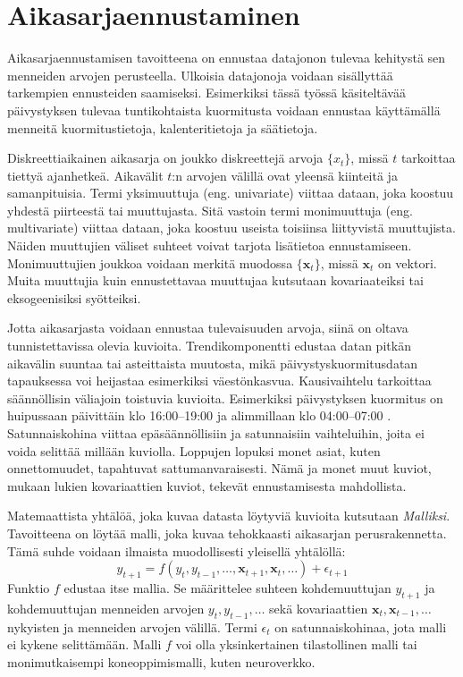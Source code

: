 \section*{Aikasarjaennustaminen}

Aikasarjaennustamisen tavoitteena on ennustaa datajonon tulevaa kehitystä sen menneiden arvojen perusteella. Ulkoisia datajonoja voidaan sisällyttää tarkempien ennusteiden saamiseksi. \cite{hyndman2018forecasting} Esimerkiksi tässä työssä käsiteltävää päivystyksen tulevaa tuntikohtaista kuormitusta voidaan ennustaa käyttämällä menneitä kuormitustietoja, kalenteritietoja ja säätietoja.

Diskreettiaikainen aikasarja on joukko diskreettejä arvoja $\{x_t\}$, missä $t$ tarkoittaa tiettyä ajanhetkeä. Aikavälit $t$:n arvojen välillä ovat yleensä kiinteitä ja samanpituisia. Termi yksimuuttuja (eng. univariate) viittaa dataan, joka koostuu yhdestä piirteestä tai muuttujasta. Sitä vastoin termi monimuuttuja (eng. multivariate) viittaa dataan, joka koostuu useista toisiinsa liittyvistä muuttujista. Näiden muuttujien väliset suhteet voivat tarjota lisätietoa ennustamiseen. Monimuuttujien joukkoa voidaan merkitä muodossa $\{\mathbf{x}_{t}\}$, missä $\mathbf{x}_t$ on vektori. Muita muuttujia kuin ennustettavaa muuttujaa kutsutaan kovariaateiksi tai eksogeenisiksi syötteiksi. \cite{brockwell_introduction_2016}

Jotta aikasarjasta voidaan ennustaa tulevaisuuden arvoja, siinä on oltava tunnistettavissa olevia kuvioita. Trendikomponentti edustaa datan pitkän aikavälin suuntaa tai asteittaista muutosta, mikä päivystyskuormitusdatan tapauksessa voi heijastaa esimerkiksi väestönkasvua. Kausivaihtelu tarkoittaa säännöllisin väliajoin toistuvia kuvioita. Esimerkiksi päivystyksen kuormitus on huipussaan päivittäin klo 16:00–19:00 ja alimmillaan klo 04:00–07:00 \cite{tuominen_forecasting_2024}. Satunnaiskohina viittaa epäsäännöllisiin ja satunnaisiin vaihteluihin, joita ei voida selittää millään kuviolla. Loppujen lopuksi monet asiat, kuten onnettomuudet, tapahtuvat sattumanvaraisesti. Nämä ja monet muut kuviot, mukaan lukien kovariaattien kuviot, tekevät ennustamisesta mahdollista. \cite{brockwell_introduction_2016}

Matemaattista yhtälöä, joka kuvaa datasta löytyviä kuvioita kutsutaan \emph{Malliksi}. Tavoitteena on löytää malli, joka kuvaa tehokkaasti aikasarjan perusrakennetta. Tämä suhde voidaan ilmaista muodollisesti yleisellä yhtälöllä:
\begin{equation}
y_{t+1} = f(y_{t}, y_{t-1}, \dots, \mathbf{x}_{t+1}, \mathbf{x}_{t}, \dots) + \epsilon_{t+1}
\end{equation}
Funktio $f$ edustaa itse mallia. Se määrittelee suhteen kohdemuuttujan $y_{t+1}$ ja kohdemuuttujan menneiden arvojen $y_{t}, y_{t-1}, \dots$ sekä kovariaattien $\mathbf{x}_{t}, \mathbf{x}_{t-1}, \dots$ nykyisten ja menneiden arvojen välillä. Termi $\epsilon_t$ on satunnaiskohinaa, jota malli ei kykene selittämään. Malli $f$ voi olla yksinkertainen tilastollinen malli tai monimutkaisempi koneoppimismalli, kuten neuroverkko. \cite{hyndman2018forecasting}

